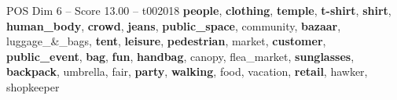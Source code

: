 \begin{textsample}{POS Dim 6 – Score 13.00 – t002018}  \label{ex:f6_pos_010}
\textbf{people}, \textbf{clothing}, \textbf{temple}, \textbf{t-shirt}, \textbf{shirt}, \textbf{human\_body}, \textbf{crowd}, \textbf{jeans}, \textbf{public\_space}, community, \textbf{bazaar}, luggage\_\&\_bags, \textbf{tent}, \textbf{leisure}, \textbf{pedestrian}, market, \textbf{customer}, \textbf{public\_event}, \textbf{bag}, \textbf{fun}, \textbf{handbag}, canopy, flea\_market, \textbf{sunglasses}, \textbf{backpack}, umbrella, fair, \textbf{party}, \textbf{walking}, food, vacation, \textbf{retail}, hawker, shopkeeper

\end{textsample}
